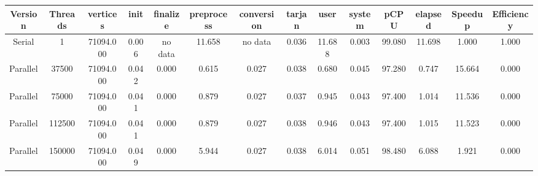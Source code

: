 \begin{tabular}{|c|c|c|c|c|c|c|c|c|c|c|c|c|c|}
\toprule
 Version &  Threads &   vertices &  init & finalize &  preprocess & conversion &  tarjan &   user &  system &   pCPU &  elapsed &  Speedup &  Efficiency \\
\midrule
  Serial &        1 &  71094.000 & 0.006 &  no data &      11.658 &    no data &   0.036 & 11.688 &   0.003 & 99.080 &   11.698 &    1.000 &       1.000 \\
Parallel &    37500 &  71094.000 & 0.042 &    0.000 &       0.615 &      0.027 &   0.038 &  0.680 &   0.045 & 97.280 &    0.747 &   15.664 &       0.000 \\
Parallel &    75000 &  71094.000 & 0.041 &    0.000 &       0.879 &      0.027 &   0.037 &  0.945 &   0.043 & 97.400 &    1.014 &   11.536 &       0.000 \\
Parallel &   112500 &  71094.000 & 0.041 &    0.000 &       0.879 &      0.027 &   0.038 &  0.946 &   0.043 & 97.400 &    1.015 &   11.523 &       0.000 \\
Parallel &   150000 &  71094.000 & 0.049 &    0.000 &       5.944 &      0.027 &   0.038 &  6.014 &   0.051 & 98.480 &    6.088 &    1.921 &       0.000 \\
\bottomrule
\end{tabular}
